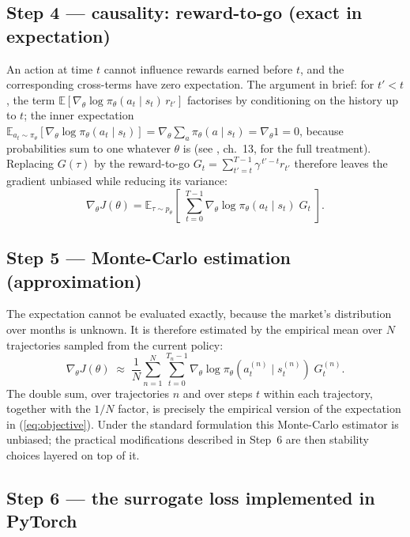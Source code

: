 \subsection{Step 4 --- causality: reward-to-go (exact in expectation)}

An action at time $t$ cannot influence rewards earned before $t$, and the
corresponding cross-terms have zero expectation. The argument in brief:
for $t' < t$, the term
$\mathbb{E}[\nabla_\theta \log \pi_\theta(a_t \mid s_t)\, r_{t'}]$
factorises by conditioning on the history up to $t$; the inner
expectation
$\mathbb{E}_{a_t \sim \pi_\theta}[\nabla_\theta \log \pi_\theta(a_t \mid s_t)]
= \nabla_\theta \sum_a \pi_\theta(a \mid s_t) = \nabla_\theta 1 = 0$,
because probabilities sum to one whatever $\theta$ is (see
\cite{sutton2018}, ch.~13, for the full treatment). Replacing
$G(\tau)$ by the reward-to-go
$G_t = \sum_{t'=t}^{T-1}\gamma^{\,t'-t} r_{t'}$ therefore leaves the
gradient unbiased while reducing its variance:
\begin{equation}
\nabla_\theta J(\theta)
= \mathbb{E}_{\tau\sim p_\theta}\!\left[\;
   \sum_{t=0}^{T-1} \nabla_\theta \log \pi_\theta(a_t \mid s_t)\; G_t
  \;\right].
\label{eq:pg_togo}
\end{equation}

\subsection{Step 5 --- Monte-Carlo estimation (approximation)}

The expectation cannot be evaluated exactly, because the market's
distribution over months is unknown. It is therefore estimated by the
empirical mean over $N$ trajectories sampled from the current policy:
\begin{equation}
\nabla_\theta J(\theta) \;\approx\; \frac{1}{N} \sum_{n=1}^{N}
  \sum_{t=0}^{T_n-1} \nabla_\theta \log \pi_\theta(a^{(n)}_t \mid s^{(n)}_t)\;
  G^{(n)}_t .
\label{eq:pg_mc}
\end{equation}
The double sum, over trajectories $n$ and over steps $t$ within each
trajectory, together with the $1/N$ factor, is precisely the empirical
version of the expectation in (\ref{eq:objective}). Under the standard
formulation this Monte-Carlo estimator is unbiased; the practical
modifications described in Step~6 are then stability choices layered on
top of it.

\subsection{Step 6 --- the surrogate loss implemented in PyTorch}

